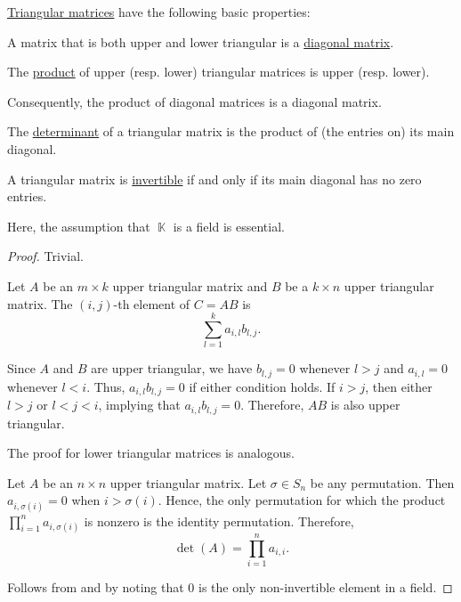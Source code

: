 \begin{proposition}\label{thm:def:triangular_matrix}
  \hyperref[def:triangular_matrix]{Triangular matrices} have the following basic properties:
  \begin{thmenum}
     A matrix that is both upper and lower triangular is a \hyperref[def:matrix_diagonal]{diagonal matrix}.

     The \hyperref[thm:matrix_algebra/matrix_multiplication]{product} of upper (resp. lower) triangular matrices is upper (resp. lower).

    Consequently, the product of diagonal matrices is a diagonal matrix.

     The \hyperref[thm:def:triangular_matrix/determinant]{determinant} of a triangular matrix is the product of (the entries on) its main diagonal.

     A triangular matrix is \hyperref[def:inverse_matrix]{invertible} if and only if its main diagonal has no zero entries.

    Here, the assumption that \( \BbbK \) is a field is essential.
  \end{thmenum}
\end{proposition}
\begin{proof}
   Trivial.

   Let \( A \) be an \( m \times k \) upper triangular matrix and \( B \) be a \( k \times n \) upper triangular matrix. The \( (i, j) \)-th element of \( C = AB \) is
  \begin{equation*}
    \sum_{l=1}^k a_{i,l} b_{l,j}.
  \end{equation*}

  Since \( A \) and \( B \) are upper triangular, we have \( b_{l,j} = 0 \) whenever \( l > j \) and \( a_{i,l} = 0 \) whenever \( l < i \). Thus, \( a_{i,l} b_{l,j} = 0 \) if either condition holds. If \( i > j \), then either \( l > j \) or \( l < j < i \), implying that \( a_{i,l} b_{l,j} = 0 \). Therefore, \( AB \) is also upper triangular.

  The proof for lower triangular matrices is analogous.

   Let \( A \) be an \( n \times n \) upper triangular matrix. Let \( \sigma \in S_n \) be any permutation. Then \( a_{i,\sigma(i)} = 0 \) when \( i > \sigma(i) \). Hence, the only permutation for which the product \( \prod_{i=1}^n a_{i,\sigma(i)} \) is nonzero is the identity permutation. Therefore,
  \begin{equation*}
    \det(A) = \prod_{i=1}^n a_{i,i}.
  \end{equation*}

   Follows from  and  by noting that \( 0 \) is the only non-invertible element in a field.
\end{proof}

